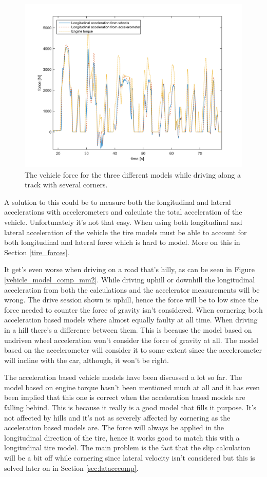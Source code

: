 \begin{figure}[h]
	\centering
	\includegraphics[width=1\textwidth]{Pictures/vehicle_model_comp_race}
	\caption{The vehicle force for the three different models while driving along a track with several corners.}
	\label{vehicle_model_comp_race}
\end{figure}

A solution to this could be to measure both the longitudinal and lateral accelerations with accelerometers and calculate the total acceleration of the vehicle. Unfortunately it's not that easy. When using both longitudinal and lateral acceleration of the vehicle the tire models must be able to account for both longitudinal and lateral force which is hard to model. More on this in Section \ref{tire_forces}.

It get's even worse when driving on a road that's hilly, as can be seen in Figure \ref{vehicle_model_comp_mm2}. While driving uphill or downhill the longitudinal acceleration from both the calculations and the accelerator measurements will be wrong. The drive session shown is uphill, hence the force will be to low since the force needed to counter the force of gravity isn't considered. When cornering both acceleration based models where almost equally faulty at all time. When driving in a hill there's a difference between them. This is because the model based on undriven wheel acceleration won't consider the force of gravity at all. The model based on the accelerometer will consider it to some extent since the accelerometer will incline with the car, although, it won't be right.

The acceleration based vehicle models have been discussed a lot so far. The model based on engine torque hasn't been mentioned much at all and it has even been implied that this one is correct when the acceleration based models are falling behind. This is because it really is a good model that fills it purpose. It's not affected by hills and it's not as severely affected by cornering as the acceleration based models are. The force will always be applied in the longitudinal direction of the tire, hence it works good to match this with a longitudinal tire model. The main problem is the fact that the slip calculation will be a bit off while cornering since lateral velocity isn't considered but this is solved later on in Section \ref{sec:latacccomp}. 

